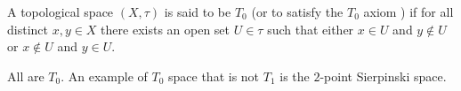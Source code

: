 \documentclass[12pt]{article}
\begin{document}
A topological space $(X,\tau)$ is said to be $T_0$
(or to satisfy the $T_0$ axiom )
if for all distinct $x,y\in X$
there exists an open set $U\in\tau$ such that
either $x\in U$ and $y\notin U$ or $x\notin U$ and $y\in U$.

All  are $T_0$.
An example of $T_0$ space that is not $T_1$
is the $2$-point Sierpinski space.
\end{document}
